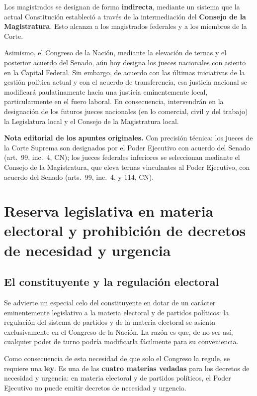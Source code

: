\documentclass[12pt,oneside]{book}
\begin{document}
Los magistrados se designan de forma \textbf{indirecta}, mediante un sistema que la actual Constitución estableció a través de la intermediación del \textbf{Consejo de la Magistratura}. Esto alcanza a los magistrados federales y a los miembros de la Corte.

Asimismo, el Congreso de la Nación, mediante la elevación de ternas y el posterior acuerdo del Senado, aún hoy designa los jueces nacionales con asiento en la Capital Federal. Sin embargo, de acuerdo con las últimas iniciativas de la gestión política actual y con el acuerdo de transferencia, esa justicia nacional se modificará paulatinamente hacia una justicia eminentemente local, particularmente en el fuero laboral. En consecuencia, intervendrán en la designación de los futuros jueces nacionales (en lo comercial, civil y del trabajo) la Legislatura local y el Consejo de la Magistratura local.

\begin{note}
\textbf{Nota editorial de los apuntes originales.} Con precisión técnica: los jueces de la Corte Suprema son designados por el Poder Ejecutivo con acuerdo del Senado (art.~99, inc.~4, CN); los jueces federales inferiores se seleccionan mediante el Consejo de la Magistratura, que eleva ternas vinculantes al Poder Ejecutivo, con acuerdo del Senado (arts.~99, inc.~4, y 114, CN).
\end{note}

\section{Reserva legislativa en materia electoral y prohibición de decretos de necesidad y urgencia}

\subsection{El constituyente y la regulación electoral}

Se advierte un especial celo del constituyente en dotar de un carácter eminentemente legislativo a la materia electoral y de partidos políticos: la regulación del sistema de partidos y de la materia electoral se asienta exclusivamente en el Congreso de la Nación. La razón es que, de no ser así, cualquier poder de turno podría modificarla fácilmente para su conveniencia.

Como consecuencia de esta necesidad de que solo el Congreso la regule, se requiere una \textbf{ley}. Es una de las \textbf{cuatro materias vedadas} para los decretos de necesidad y urgencia: en materia electoral y de partidos políticos, el Poder Ejecutivo no puede emitir decretos de necesidad y urgencia.
\end{document}
